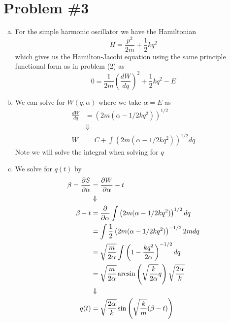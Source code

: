 \documentclass[11pt]{article}
\numberwithin{equation}{section}
\begin{document}
\section{Problem \#3}
\begin{enumerate}[(a)]
\item For the simple harmonic oscillator we have the Hamiltonian
$$H = \frac{p^2}{2m}+\frac{1}{2}kq^2$$
which gives us the Hamilton-Jacobi equation using the same principle functional form as in
problem (2) as
$$0 = \frac{1}{2m}\left(\frac{dW}{dq}\right)^2 + \frac{1}{2}kq^2 - E$$

\item
We can solve for $W(q,\alpha)$ where we take $\alpha=E$ as
\begin{align*}
\frac{dW}{dq} &= \left(2m(\alpha-1/2kq^2)\right)^{1/2}\\
&\Downarrow\\
W &= C + \int\left(2m(\alpha-1/2kq^2)\right)^{1/2}dq
\end{align*}
Note we will solve the integral when solving for $q$

\item We solve for $q(t)$ by
\begin{align*}
\beta = \frac{\partial{S}}{\partial{\alpha}} &= \frac{\partial{W}}{\partial{\alpha}} - t\\
&\Downarrow\\
\beta - t &= \frac{\partial{}}{\partial{\alpha}}\int\left(2m(\alpha-1/2kq^2)\right)^{1/2}dq\\
&= \int\frac{1}{2}\left(2m(\alpha-1/2kq^2)\right)^{-1/2}2mdq\\
&= \sqrt{\frac{m}{2\alpha}}\int\left(1-\frac{kq^2}{2\alpha}\right)^{-1/2}dq\\
&= \sqrt{\frac{m}{2\alpha}}\arcsin\left(\sqrt{\frac{k}{2\alpha}}q\right)\sqrt{\frac{2\alpha}{k}}\\
&\Downarrow\\
q(t) &= \sqrt{\frac{2\alpha}{k}}\sin\left(\sqrt{\frac{k}{m}}(\beta-t)\right)
\end{align*}


\end{enumerate}
\end{document}
